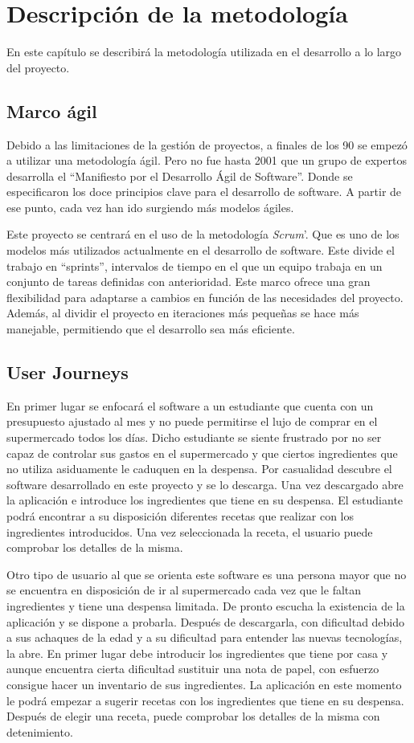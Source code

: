 \chapter{Descripción de la metodología}
En este capítulo se describirá la metodología utilizada en el desarrollo a lo largo del proyecto.

\section{Marco ágil}
Debido a las limitaciones de la gestión de proyectos, a finales de los 90 se empezó a utilizar una metodología ágil. Pero no fue hasta 2001 que un grupo de expertos desarrolla el ``Manifiesto por el Desarrollo Ágil de Software''. Donde se especificaron los doce principios clave para el desarrollo de software. A partir de ese punto, cada vez han ido surgiendo más modelos ágiles.

Este proyecto se centrará en el uso de la metodología \emph{Scrum}'. Que es uno de los modelos más utilizados actualmente en el desarrollo de software. Este divide el trabajo en ``sprints'', intervalos de tiempo en el que un equipo trabaja en un conjunto de tareas definidas con anterioridad. Este marco ofrece una gran flexibilidad para adaptarse a cambios en función de las necesidades del proyecto. Además, al dividir el proyecto en iteraciones más pequeñas se hace más manejable, permitiendo que el desarrollo sea más eficiente.

\section{User Journeys}

En primer lugar se enfocará el software a un estudiante que cuenta con un presupuesto ajustado al mes y no puede permitirse el lujo de comprar en el supermercado todos los días. Dicho estudiante se siente frustrado por no ser capaz de controlar sus gastos en el supermercado y que ciertos ingredientes que no utiliza asiduamente le caduquen en la despensa. Por casualidad descubre el software desarrollado en este proyecto y se lo descarga. Una vez descargado abre la aplicación e introduce los ingredientes que tiene en su despensa. El estudiante podrá encontrar a su disposición diferentes recetas que realizar con los ingredientes introducidos. Una vez seleccionada la receta, el usuario puede comprobar los detalles de la misma.

Otro tipo de usuario al que se orienta este software es una persona mayor que no se encuentra en disposición de ir al supermercado cada vez que le faltan ingredientes y tiene una despensa limitada. De pronto escucha la existencia de la aplicación y se dispone a probarla. Después de descargarla, con dificultad debido a sus achaques de la edad y a su dificultad para entender las nuevas tecnologías, la abre. En primer lugar debe introducir los ingredientes que tiene por casa y aunque encuentra cierta dificultad sustituir una nota de papel, con esfuerzo consigue hacer un inventario de sus ingredientes. La aplicación en este momento le podrá empezar a sugerir recetas con los ingredientes que tiene en su despensa. Después de elegir una receta, puede comprobar los detalles de la misma con detenimiento.


